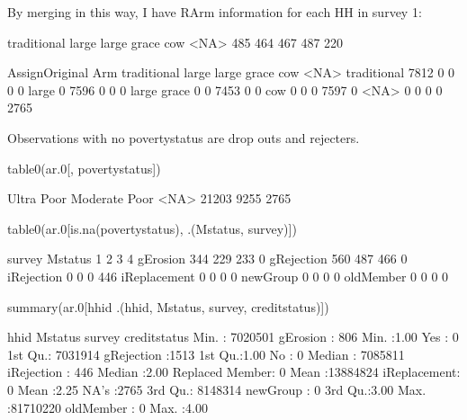 By merging in this way, I have \textsf{RArm} information for each HH in survey 1:
\begin{Schunk}
\begin{Soutput}

traditional       large large grace         cow        <NA> 
        485         464         467         487         220 
\end{Soutput}
\begin{Soutput}
             AssignOriginal
Arm           traditional large large grace  cow <NA>
  traditional        7812     0           0    0    0
  large                 0  7596           0    0    0
  large grace           0     0        7453    0    0
  cow                   0     0           0 7597    0
  <NA>                  0     0           0    0 2765
\end{Soutput}
\end{Schunk}
Observations with no \textsf{povertystatus} are drop outs and rejecters.
\begin{Schunk}
\begin{Sinput}
table0(ar.0[, povertystatus])
\end{Sinput}
\begin{Soutput}

   Ultra Poor Moderate Poor          <NA> 
        21203          9255          2765 
\end{Soutput}
\begin{Sinput}
table0(ar.0[is.na(povertystatus), .(Mstatus, survey)])
\end{Sinput}
\begin{Soutput}
              survey
Mstatus          1   2   3   4
  gErosion     344 229 233   0
  gRejection   560 487 466   0
  iRejection     0   0   0 446
  iReplacement   0   0   0   0
  newGroup       0   0   0   0
  oldMember      0   0   0   0
\end{Soutput}
\begin{Sinput}
summary(ar.0[hhid %in% hhid[is.na(povertystatus)], 
  .(hhid, Mstatus, survey, creditstatus)])
\end{Sinput}
\begin{Soutput}
      hhid                  Mstatus         survey              creditstatus 
 Min.   : 7020501   gErosion    : 806   Min.   :1.00   Yes            :   0  
 1st Qu.: 7031914   gRejection  :1513   1st Qu.:1.00   No             :   0  
 Median : 7085811   iRejection  : 446   Median :2.00   Replaced Member:   0  
 Mean   :13884824   iReplacement:   0   Mean   :2.25   NA's           :2765  
 3rd Qu.: 8148314   newGroup    :   0   3rd Qu.:3.00                         
 Max.   :81710220   oldMember   :   0   Max.   :4.00                         
\end{Soutput}
\end{Schunk}



